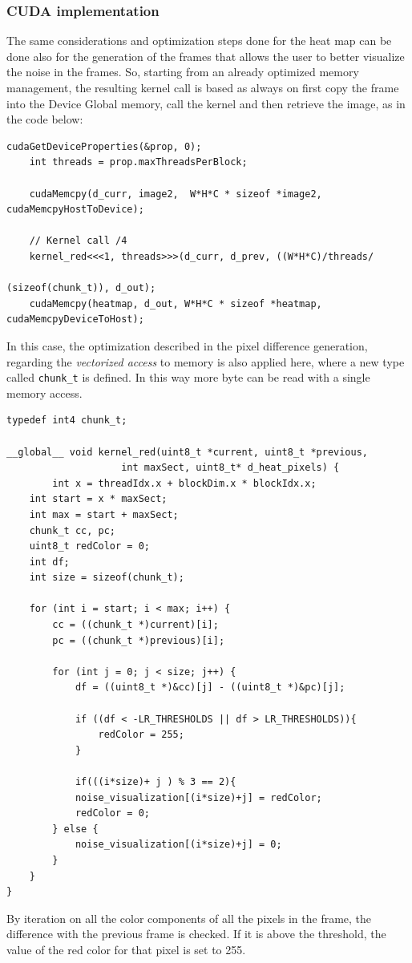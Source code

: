 \documentclass[paper=a4, fontsize=10pt]{scrartcl}	%
\begin{document}
	\subsubsection{CUDA implementation}
	The same considerations and optimization steps done for the heat map can be done also for the generation of the frames that allows the user to better visualize the noise in the frames. So, starting from an already optimized memory management, the resulting kernel call is based as always on first copy the frame into the Device Global memory, call the kernel and then retrieve the image, as in the code below:
\begin{lstlisting}[style=CStyle]
	cudaGetDeviceProperties(&prop, 0);
	int threads = prop.maxThreadsPerBlock;
	
	cudaMemcpy(d_curr, image2,  W*H*C * sizeof *image2, cudaMemcpyHostToDevice);
	
	// Kernel call /4
	kernel_red<<<1, threads>>>(d_curr, d_prev, ((W*H*C)/threads/
																(sizeof(chunk_t)), d_out);
	cudaMemcpy(heatmap, d_out, W*H*C * sizeof *heatmap, cudaMemcpyDeviceToHost);\end{lstlisting}
	
	In this case, the optimization described in the pixel difference generation, regarding the \textit{vectorized access} to memory is also applied here, where a new type called \texttt{chunk\_t} is defined. In this way more byte can be read with a single memory access.
	
	\begin{lstlisting}[style=CStyle]
typedef int4 chunk_t;
	
__global__ void kernel_red(uint8_t *current, uint8_t *previous,
					int maxSect, uint8_t* d_heat_pixels) {
	    int x = threadIdx.x + blockDim.x * blockIdx.x;
	int start = x * maxSect;
	int max = start + maxSect;
	chunk_t cc, pc;
	uint8_t redColor = 0;
	int df;
	int size = sizeof(chunk_t);
	
	for (int i = start; i < max; i++) {
		cc = ((chunk_t *)current)[i];
		pc = ((chunk_t *)previous)[i];
		
		for (int j = 0; j < size; j++) {
			df = ((uint8_t *)&cc)[j] - ((uint8_t *)&pc)[j];
			
			if ((df < -LR_THRESHOLDS || df > LR_THRESHOLDS)){
				redColor = 255;
			}
			
			if(((i*size)+ j ) % 3 == 2){
			noise_visualization[(i*size)+j] = redColor;
			redColor = 0;
		} else {
			noise_visualization[(i*size)+j] = 0;
		}
	}
}	\end{lstlisting}
	By iteration on all the color components of all the pixels in the frame, the difference with the previous frame is checked. If it is above the threshold, the value of the red color for that pixel is set to 255. 
	
\end{document}
